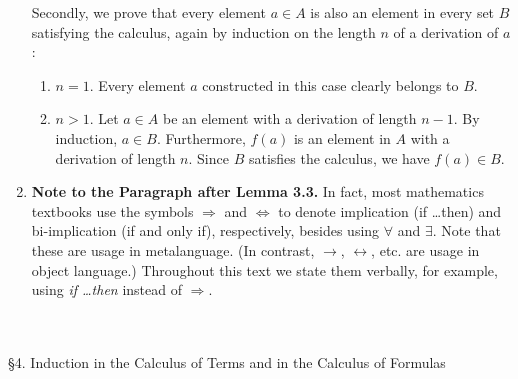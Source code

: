\begin{enumerate}[1.]
\begin{enumerate}[(1)]
\end{enumerate}
Secondly, we prove that every element $a \in A$ is also an element in every set $B$ satisfying the calculus, again by induction on the length $n$ of a derivation of $a$:
\begin{enumerate}[(1)]
\item $n = 1$. Every element $a$ constructed in this case clearly belongs to $B$.
\item $n > 1$. Let $a \in A$ be an element with a derivation of length $n - 1$. By induction, $a \in B$. Furthermore, $f(a)$ is an element in $A$ with a derivation of length $n$. Since $B$ satisfies the calculus, we have $f(a) \in B$.
\end{enumerate}
%
\item \textbf{Note to the Paragraph after Lemma 3.3.} In fact, most mathematics textbooks use the symbols $\Rightarrow$ and $\Leftrightarrow$ to denote implication (if \ldots then) and bi-implication (if and only if), respectively, besides using $\forall$ and $\exists$. Note that these are usage in metalanguage. (In contrast, $\rightarrow$, $\leftrightarrow$, etc. are usage in object language.) Throughout this text we state them verbally, for example, using \emph{if \ldots then} instead of $\Rightarrow$.
\end{enumerate}
\ 
\\
\\
{\large \S4. Induction in the Calculus of Terms and in the Calculus of Formulas}
